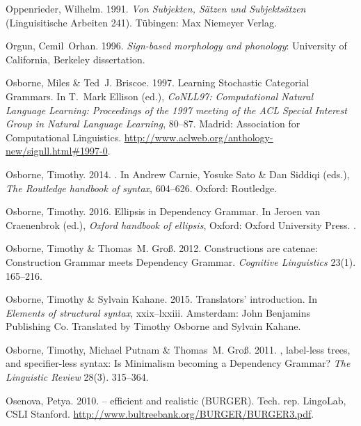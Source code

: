 \begin{thebibliography}{1420}
Oppenrieder, Wilhelm. 1991.
\newblock \emph{{Von Subjekten, S{\"a}tzen und Subjekts{\"a}tzen}}
  (Linguisitische Arbeiten 241).
\newblock T{\"u}bingen: Max Niemeyer Verlag.

Orgun, Cemil~Orhan. 1996.
\newblock \emph{Sign-based morphology and phonology}: University of California,
  Berkeley dissertation.

Osborne, Miles \& Ted~J. Briscoe. 1997.
\newblock Learning {Stochastic Categorial Grammars}.
\newblock In T.~Mark Ellison (ed.), \emph{{CoNLL97: Computational Natural
  Language Learning}: {Proceedings} of the 1997 meeting of the {ACL Special
  Interest Group in Natural Language Learning}}, 80--87. Madrid: Association
  for Computational Linguistics.
\newblock
  \urlprefix\url{http://www.aclweb.org/anthology-new/signll.html\#1997-0}.

Osborne, Timothy. 2014.
.
\newblock In Andrew Carnie, Yosuke Sato \& Dan Siddiqi (eds.), \emph{The
  {Routledge} handbook of syntax}, 604--626. Oxford: Routledge.

Osborne, Timothy. 2016.
\newblock Ellipsis in {Dependency Grammar}.
\newblock In Jeroen van Craenenbrok (ed.), \emph{Oxford handbook of ellipsis},
  Oxford: Oxford University Press.
\newblock \toappear.

Osborne, Timothy \& Thomas~M. Gro{\ss}. 2012.
\newblock Constructions are catenae: {Construction Grammar} meets {Dependency
  Grammar}.
\newblock \emph{Cognitive Linguistics} 23(1). 165--216.

Osborne, Timothy \& Sylvain Kahane. 2015.
\newblock Translators' introduction.
\newblock In \emph{Elements of structural syntax}, xxix--lxxiii. Amsterdam:
  John Benjamins Publishing Co.
\newblock Translated by Timothy Osborne and Sylvain Kahane.

Osborne, Timothy, Michael Putnam \& Thomas~M. Gro{\ss}. 2011.
, label-less trees, and specifier-less syntax:
  {Is} {Minimalism} becoming a {Dependency Grammar}?
\newblock \emph{The Linguistic Review} 28(3). 315--364.

Osenova, Petya. 2010{}.
 -- efficient and realistic {(BURGER)}.
\newblock Tech. rep. LingoLab, CSLI Stanford.
\newblock \urlprefix\url{http://www.bultreebank.org/BURGER/BURGER3.pdf}.


\end{thebibliography}
